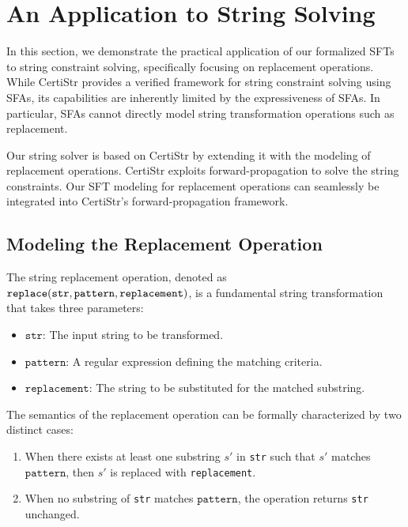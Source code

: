 \documentclass[sigplan,10pt,anonymous,review]{acmart}\settopmatter{printfolios=true,printccs=false,printacmref=false}
\begin{document}
\section{An Application to String Solving}
\label{sec-app-str-solver}

In this section, we demonstrate the practical application of our formalized SFTs to string constraint solving, specifically focusing on replacement operations. While CertiStr \cite{cpp/KanLRS22} provides a verified framework for string constraint solving using SFAs, its capabilities are inherently limited by the expressiveness of SFAs. In particular, SFAs cannot directly model string transformation operations such as replacement.

Our string solver is based on CertiStr \cite{cpp/KanLRS22} by extending it with the modeling of replacement operations. CertiStr exploits forward-propagation to solve the string constraints. Our SFT modeling for replacement operations can seamlessly be integrated into CertiStr's forward-propagation framework.



\subsection{Modeling the Replacement Operation}


The string replacement operation, denoted as 
$\texttt{replace}(\texttt{str}, \newline\texttt{pattern}, \texttt{replacement})$, is a fundamental string transformation that takes three parameters:
\begin{itemize}
  \item $\texttt{str}$: The input string to be transformed.
  \item $\texttt{pattern}$: A regular expression defining the matching criteria.  
  \item $\texttt{replacement}$: The string to be substituted for the matched substring.
\end{itemize}

The semantics of the replacement operation can be formally characterized by two distinct cases:
\begin{enumerate}
  \item When there exists at least one substring $s'$ in \texttt{str} such that $s'$ matches $\texttt{pattern}$, then $s'$ is replaced with \texttt{replacement}.
  \item When no substring of \texttt{str} matches $\texttt{pattern}$, the operation returns \texttt{str} unchanged.
\end{enumerate}
\end{document}
